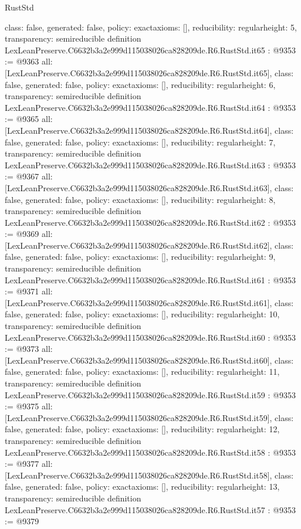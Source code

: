 \begin{lexlean}{RustStd}
\begin{coremodule}
{  class: false,
  generated: false,
  policy: exact{axioms: []},
  reducibility: regular{height: 5},
  transparency: semireducible
}
definition LexLeanPreserve.C6632b3a2e999d115038026ca828209de.R6.RustStd.it65 : @9353 := @9363 {
  all: [LexLeanPreserve.C6632b3a2e999d115038026ca828209de.R6.RustStd.it65],
  class: false,
  generated: false,
  policy: exact{axioms: []},
  reducibility: regular{height: 6},
  transparency: semireducible
}
definition LexLeanPreserve.C6632b3a2e999d115038026ca828209de.R6.RustStd.it64 : @9353 := @9365 {
  all: [LexLeanPreserve.C6632b3a2e999d115038026ca828209de.R6.RustStd.it64],
  class: false,
  generated: false,
  policy: exact{axioms: []},
  reducibility: regular{height: 7},
  transparency: semireducible
}
definition LexLeanPreserve.C6632b3a2e999d115038026ca828209de.R6.RustStd.it63 : @9353 := @9367 {
  all: [LexLeanPreserve.C6632b3a2e999d115038026ca828209de.R6.RustStd.it63],
  class: false,
  generated: false,
  policy: exact{axioms: []},
  reducibility: regular{height: 8},
  transparency: semireducible
}
definition LexLeanPreserve.C6632b3a2e999d115038026ca828209de.R6.RustStd.it62 : @9353 := @9369 {
  all: [LexLeanPreserve.C6632b3a2e999d115038026ca828209de.R6.RustStd.it62],
  class: false,
  generated: false,
  policy: exact{axioms: []},
  reducibility: regular{height: 9},
  transparency: semireducible
}
definition LexLeanPreserve.C6632b3a2e999d115038026ca828209de.R6.RustStd.it61 : @9353 := @9371 {
  all: [LexLeanPreserve.C6632b3a2e999d115038026ca828209de.R6.RustStd.it61],
  class: false,
  generated: false,
  policy: exact{axioms: []},
  reducibility: regular{height: 10},
  transparency: semireducible
}
definition LexLeanPreserve.C6632b3a2e999d115038026ca828209de.R6.RustStd.it60 : @9353 := @9373 {
  all: [LexLeanPreserve.C6632b3a2e999d115038026ca828209de.R6.RustStd.it60],
  class: false,
  generated: false,
  policy: exact{axioms: []},
  reducibility: regular{height: 11},
  transparency: semireducible
}
definition LexLeanPreserve.C6632b3a2e999d115038026ca828209de.R6.RustStd.it59 : @9353 := @9375 {
  all: [LexLeanPreserve.C6632b3a2e999d115038026ca828209de.R6.RustStd.it59],
  class: false,
  generated: false,
  policy: exact{axioms: []},
  reducibility: regular{height: 12},
  transparency: semireducible
}
definition LexLeanPreserve.C6632b3a2e999d115038026ca828209de.R6.RustStd.it58 : @9353 := @9377 {
  all: [LexLeanPreserve.C6632b3a2e999d115038026ca828209de.R6.RustStd.it58],
  class: false,
  generated: false,
  policy: exact{axioms: []},
  reducibility: regular{height: 13},
  transparency: semireducible
}
definition LexLeanPreserve.C6632b3a2e999d115038026ca828209de.R6.RustStd.it57 : @9353 := @9379 {
}
\end{coremodule}
\end{lexlean}
